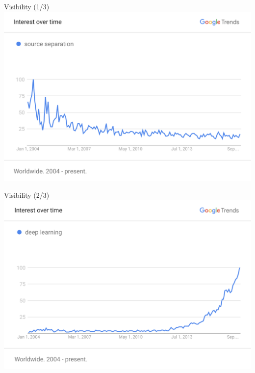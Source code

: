 \documentclass{beamer}
\begin{document}
\begin{frame}{Visibility (1/3)}
\includegraphics[width=\textwidth]{fig/source_separation.png}
\end{frame}

\begin{frame}{Visibility (2/3)}
\includegraphics[width=\textwidth]{fig/deep_learning.png}
\end{frame}
\end{document}

